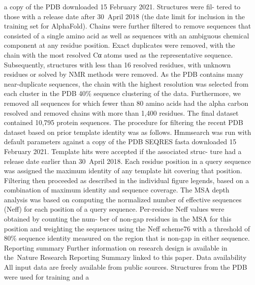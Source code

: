 a copy of the PDB downloaded 15 February 2021. Structures were fil-
tered to those with a release date after 30 April 2018 (the date limit for
inclusion in the training set for AlphaFold). Chains were further filtered
to remove sequences that consisted of a single amino acid as well as
sequences with an ambiguous chemical component at any residue
position. Exact duplicates were removed, with the chain with the most
resolved Cα atoms used as the representative sequence. Subsequently,
structures with less than 16 resolved residues, with unknown residues
or solved by NMR methods were removed. As the PDB contains many
near-duplicate sequences, the chain with the highest resolution was
selected from each cluster in the PDB 40\% sequence clustering of the
data. Furthermore, we removed all sequences for which fewer than
80 amino acids had the alpha carbon resolved and removed chains with
more than 1,400 residues. The final dataset contained 10,795 protein
sequences.
The procedure for filtering the recent PDB dataset based on prior
template identity was as follows. Hmmsearch was run with default
parameters against a copy of the PDB SEQRES fasta downloaded
15 February 2021. Template hits were accepted if the associated struc-
ture had a release date earlier than 30 April 2018. Each residue position
in a query sequence was assigned the maximum identity of any template
hit covering that position. Filtering then proceeded as described in
the individual figure legends, based on a combination of maximum
identity and sequence coverage.
The MSA depth analysis was based on computing the normalized
number of effective sequences (Neff) for each position of a query
sequence. Per-residue Neff values were obtained by counting the num-
ber of non-gap residues in the MSA for this position and weighting the
sequences using the Neff scheme76 with a threshold of 80\% sequence
identity measured on the region that is non-gap in either sequence.
Reporting summary
Further information on research design is available in the Nature
Research Reporting Summary linked to this paper.
Data availability
All input data are freely available from public sources.
Structures from the PDB were used for training and a


